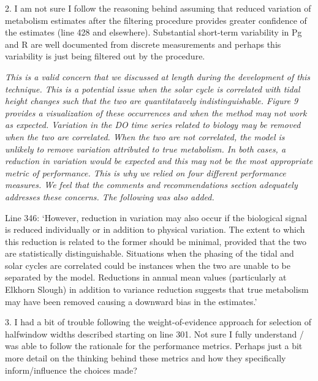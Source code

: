 \documentclass[letterpaper,12pt]{article}\usepackage[]{graphicx}\usepackage[]{color}
\begin{document}
2. I am not sure I follow the reasoning behind assuming that reduced variation of metabolism estimates after the filtering procedure provides greater confidence of the estimates (line 428 and elsewhere). Substantial short-term variability in Pg and R are well documented from discrete measurements and perhaps this variability is just being filtered out by the procedure.

{\it This is a valid concern that we discussed at length during the development of this technique.  This is a potential issue when the solar cycle is correlated with tidal height changes such that the two are quantitatavely indistinguishable.  Figure 9 provides a visualization of these occurrences and when the method may not work as expected. Variation in the DO time series related to biology may be removed when the two are correlated.  When the two are not correlated, the model is unlikely to remove variation attributed to true metabolism.  In both cases, a reduction in variation would be expected and this may not be the most appropriate metric of performance. This is why we relied on four different performance measures. We feel that the comments and recommendations section adequately addresses these concerns.  The following was also added.

Line 346: `However, reduction in variation may also occur if the biological signal is reduced individually or in addition to physical variation.  The extent to which this reduction is related to the former should be minimal, provided that the two are statistically distinguishable.  Situations when the phasing of the tidal and solar cycles are correlated could be instances when the two are unable to be separated by the model.  Reductions in annual mean values (particularly at Elkhorn Slough) in addition to variance reduction suggests that true metabolism may have been removed causing a downward bias in the estimates.'
}

3. I had a bit of trouble following the weight-of-evidence approach for selection of halfwindow widths described starting on line 301. Not sure I fully understand / was able to follow the rationale for the performance metrics. Perhaps just a bit more detail on the thinking behind these metrics and how they specifically inform/influence the choices made?
\end{document}
